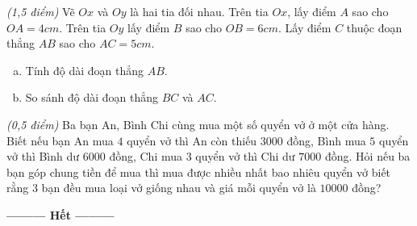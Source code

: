 \begin{ex}
\begin{enumerate}[a)]
\end{enumerate}
\end{ex}     \begin{ex}\textit{(1,5 điểm)} Vẽ $Ox$ và $Oy$ là hai tia đối nhau. Trên tia $Ox$, lấy điểm $A$ sao cho $OA = 4cm$. Trên tia $Oy$ lấy điểm $B$ sao cho $OB =6cm$. Lấy điểm $C$ thuộc đoạn thẳng $AB$ sao cho $AC=5cm$.
\begin{enumerate}[a)]
\item Tính độ dài đoạn thẳng $AB$.
\item So sánh độ dài đoạn thẳng $BC$ và $AC$.
\end{enumerate}
\end{ex}     \begin{ex}\textit{(0,5 điểm)} 
Ba bạn An, Bình Chi cùng mua một số quyển vở ở một cửa hàng. Biết nếu bạn An mua $4$ quyển vở thì An còn thiếu $3000$ đồng, Bình mua $5$ quyển vở thì Bình dư $6000$ đồng, Chi mua $3$ quyển vở thì Chi dư $7000$ đồng. Hỏi nếu ba bạn góp chung tiền để mua thì mua được nhiều nhất bao nhiêu quyển vở biết rằng $3$ bạn đều mua loại vở giống nhau và giá mỗi quyển vở là $10000$ đồng?
\end{ex}
\begin{center}
\textbf{\textbf{---------} Hết \textbf{---------}}
\end{center}